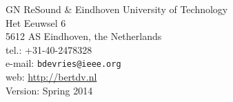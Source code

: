 GN ReSound \& Eindhoven University of Technology\\
Het Eeuwsel 6\\
5612 AS Eindhoven, the Netherlands\\
tel.: +31-40-2478328\\%
e-mail: \texttt{bdevries@ieee.org}\\%
web: \url{http://bertdv.nl}\\
\vspace{3mm} Version: Spring 2014\\

